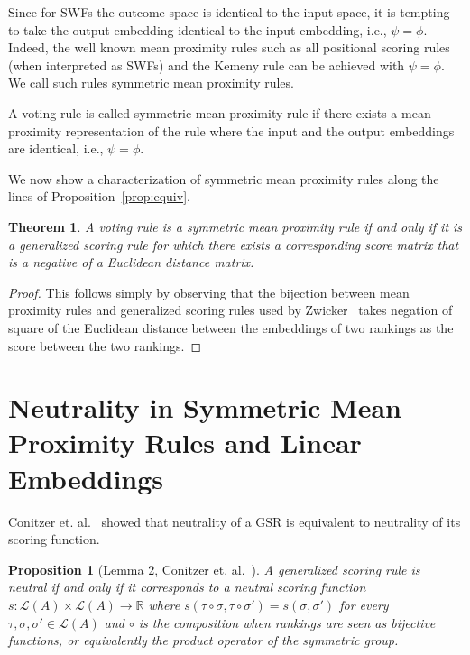 \documentclass[10pt,letterpaper]{article}
\newcommand{\calL}{{\mathcal{L}}}
\newcommand{\rank}{{\calL(A)}}
\newtheorem{theorem}{Theorem}
\newtheorem{proposition}{Proposition}
\newenvironment{definition}[1][Definition]{\begin{trivlist}
\item[\hskip \labelsep {\bfseries #1}]}{\end{trivlist}}
\begin{document}
Since for SWFs the outcome space is identical to the input space, it is tempting to take the output embedding identical to the input embedding, i.e., $\psi = \phi$. Indeed, the well known mean proximity rules such as all positional scoring rules (when interpreted as SWFs) and the Kemeny rule can be achieved with $\psi = \phi$. We call such rules symmetric mean proximity rules.

\begin{definition}[Symmetric Mean Proximity Rules]
A voting rule is called symmetric mean proximity rule if there exists a mean proximity representation of the rule where the input and the output embeddings are identical, i.e., $\psi = \phi$. 
\end{definition} 


We now show a characterization of symmetric mean proximity rules along the lines of Proposition~\ref{prop:equiv}. 
\begin{theorem}
A voting rule is a symmetric mean proximity rule if and only if it is a generalized scoring rule for which there exists a corresponding score matrix that is a negative of a Euclidean distance matrix. 
\label{thm:symm}
\end{theorem}
\begin{proof}
This follows simply by observing that the bijection between mean proximity rules and generalized scoring rules used by Zwicker~\cite{Zwicker08a} takes negation of square of the Euclidean distance between the embeddings of two rankings as the score between the two rankings. 
\end{proof}

\section{Neutrality in Symmetric Mean Proximity Rules and Linear Embeddings}

Conitzer et. al.~\cite{CRX09} showed that neutrality of a GSR is equivalent to neutrality of its scoring function.
\begin{proposition}[Lemma 2, Conitzer et. al.~\cite{CRX09}]
A generalized scoring rule is neutral if and only if it corresponds to a neutral scoring function $s : \rank \times \rank \rightarrow \mathbb{R}$ where $s(\tau \circ \sigma,\tau \circ \sigma') = s(\sigma,\sigma')$ for every $\tau, \sigma, \sigma' \in \rank$ and $\circ$ is the composition when rankings are seen as bijective functions, or equivalently the product operator of the symmetric group. 
\end{proposition}
\end{document}
